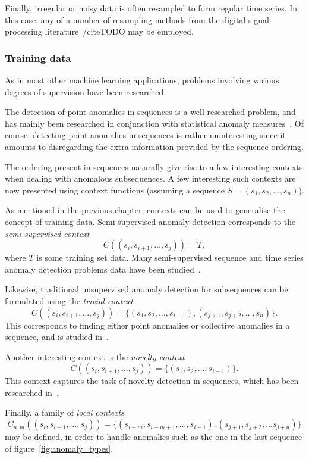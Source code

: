 Finally, irregular or noisy data is often resampled to form regular time series. In this case, any of a number of resampling methods from the digital signal processing literature~/cite{TODO} may be employed.

\subsubsection{Training data}

As in most other machine learning applications, problems involving various degrees of supervision have been researched.

The detection of point anomalies in sequences is a well-researched problem, and has mainly been researched in conjunction with statistical anomaly measures~\cite{TODO}. Of course, detecting point anomalies in sequences is rather uninteresting since it amounts to disregarding the extra information provided by the sequence ordering.

The ordering present in sequences naturally give rise to a few interesting contexts when dealing with anomalous subsequences. A few interesting such contexts are now presented using context functions (assuming a sequence $S = (s_1, s_2, \dots, s_n)$).

As mentioned in the previous chapter, contexts can be used to generalise the concept of training data. Semi-supervised anomaly detection corresponds to the \emph{semi-supervised context}
\[
    C((s_i, s_{i+1}, \dots, s_j)) = T,
\]
where $T$ is some training set data. Many semi-supervised sequence and time series anomaly detection problems data have been studied~\cite{TODO}.

Likewise, traditional unsupervised anomaly detection for subsequences can be formulated using the \emph{trivial context}
\[
    C((s_i, s_{i+1}, \dots, s_j)) = \{ (s_1, s_2, \dots, s_{i-1}), (s_{j+1}, s_{j+2}, \dots, s_n) \}.
\]
This corresponds to finding either point anomalies or collective anomalies in a sequence, and is studied in~\cite{TODO}.

Another interesting context is the \emph{novelty context}
\[
    C((s_i, s_{i+1}, \dots, s_j)) = \{(s_1, s_2, \dots, s_{i-1})\}.
\]
This context captures the task of novelty detection in sequences, which has been researched in~\cite{TODO}.

Finally, a family of \emph{local contexts}
\[
    C_{n,m}((s_i, s_{i+1}, \dots, s_j)) = \{(s_{i-m}, s_{i-m+1}, \dots, s_{i-1}), (s_{j+1}, s_{j+2}, \ldots s_{j+n})\}
\]
may be defined, in order to handle anomalies such as the one in the last sequence of figure~\ref{fig:anomaly_types}.

